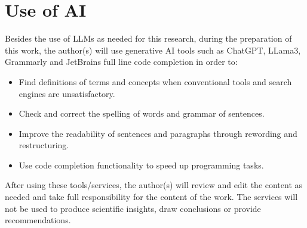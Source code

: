 \section{Use of AI}
\label{sec:use-of-ai}

Besides the use of LLMs as needed for this research, during the preparation of this work, the author(s) will use
generative AI tools such as ChatGPT, LLama3, Grammarly and JetBrains full line code completion in order to:

\begin{itemize}
    \item Find definitions of terms and concepts when conventional tools and search engines are unsatisfactory.
    \item Check and correct the spelling of words and grammar of sentences.
    \item Improve the readability of sentences and paragraphs through rewording and restructuring.
    \item Use code completion functionality to speed up programming tasks.
\end{itemize}

After using these tools/services, the author(s) will review and edit the content as needed and take full
responsibility for the content of the work.
The services will not be used to produce scientific insights, draw conclusions or provide recommendations.